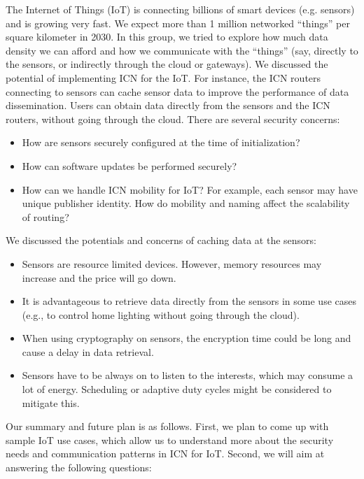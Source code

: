 \documentclass[a4paper,UKenglish]{dagrep}
\begin{document}
\license

The Internet of Things (IoT) is connecting billions of smart devices (e.g. sensors) and is growing very fast. We expect more than 1 million networked ``things'' per square kilometer in 2030. In this group, we tried to explore how much data density we can afford
and how we communicate with the ``things'' (say, directly to the sensors, or indirectly through the cloud or gateways). We discussed the potential of implementing ICN for the IoT. For instance, the ICN routers connecting to sensors can cache sensor data to improve the performance of data dissemination. Users can obtain data directly from the sensors and the ICN routers, without going through the cloud. There are several security concerns:

\begin{itemize}
\item How are sensors securely configured at the time of initialization?
\item How can software updates be performed securely?
\item How can we handle ICN mobility for IoT? For example, each sensor may have unique publisher identity. How do mobility and naming affect the scalability of routing?
\end{itemize}

We discussed the potentials and concerns of caching data at the sensors:

\begin{itemize}
\item Sensors are resource limited devices. However, memory resources may increase and the price will go down.
\item It is advantageous to retrieve data directly from the sensors in some use cases (e.g., to control home lighting without going through the cloud).
\item When using cryptography on sensors, the encryption time could be long and cause a delay in data retrieval.
\item Sensors have to be always on to listen to the interests, which may consume a lot of energy. Scheduling or adaptive duty cycles might be considered to mitigate this.
\end{itemize}

Our summary and future plan is as follows. First, we plan to come up with sample IoT use cases, which allow us to understand more about the security needs and communication patterns in ICN for IoT. Second, we will aim at answering the following questions:
\end{document}
